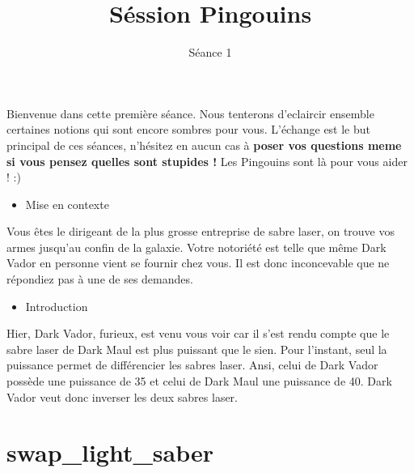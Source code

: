 \documentclass{koala-en}
\begin{document}
\title{Séssion Pingouins}
\subtitle{Séance 1}

\maketitle

{
    Bienvenue dans cette première séance. \newline
    Nous tenterons d'eclaircir ensemble certaines notions qui sont encore sombres pour vous.\newline
    L'échange est le but principal de ces séances, n'hésitez en aucun cas à \textbf{poser vos questions meme si vous pensez quelles sont stupides !} 
    \newline
  Les Pingouins sont là pour vous aider ! :) \newline
  \newline \newline
  \begin{itemize}
      \item
Mise en contexte
\end{itemize}
Vous êtes le dirigeant de la plus grosse entreprise de sabre laser, on trouve vos armes jusqu'au confin de la galaxie.
Votre notoriété est telle que même Dark Vador en personne vient se fournir chez vous.
Il est donc inconcevable que ne répondiez pas à une de ses demandes.
\newline \newline
\begin{itemize}
    \item
Introduction
\end{itemize}
Hier, Dark Vador, furieux, est venu vous voir car il s'est rendu compte que le sabre laser de Dark Maul est plus puissant que le sien.
Pour l'instant, seul la puissance permet de différencier les sabres laser.
Ansi, celui de Dark Vador possède une puissance de 35 et celui de Dark Maul une puissance de 40. Dark Vador veut donc inverser les deux sabres laser.
}

\newpage
\thispagestyle{empty}

\tableofcontents

\clearpage
\thispagestyle{empty}
\newpage

\chapter{swap\_light\_saber}
\end{document}
